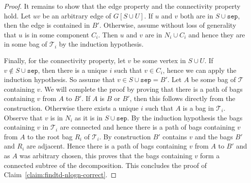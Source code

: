 \documentclass[a4paper,11pt]{article}
\theoremstyle{definition}
\theoremstyle{remark}
\newcommand{\sep}{\mathtt{sep}}
\newcommand{\td}{\mathcal{T}} \newcommand{\tw}{\mathrm{tw}} \newcommand{\w}{\mathrm{w}}
\begin{document}
\begin{proof}
It remains to show that the edge property and the connectivity
  property hold.  Let $uv$ be an arbitrary edge of $G[S \cup U]$.  If
  $u$ and $v$ both are in $S \cup \sep$, then the edge is contained in
  $B'$.  Otherwise, assume without loss of generality that $u$ is in
  some component $C_i$.  Then $u$ and $v$ are in $N_i \cup C_i$ and
  hence they are in some bag of $\td_i$ by the induction hypothesis.
  
Finally, for the connectivity property, let $v$ be some vertex in $S
  \cup U$.  If $v \notin S \cup \sep$, then there is a unique $i$ such
  that $v \in C_i$, hence we can apply the induction hypothesis.  So
  assume that $v \in S \cup \sep = B'$.  Let $A$ be some bag of $\td$
  containing $v$.  We will complete the proof by proving that there is
  a path of bags containing $v$ from $A$ to $B'$.  If $A$ is $B$ or
  $B'$, then this follows directly from the construction.  Otherwise
  there exists a unique $i$ such that $A$ is a bag in $\td_i$.
  Observe that $v$ is in $N_i$ as it is in $S \cup \sep$.  By the
  induction hypothesis the bags containing $v$ in $\td_i$ are
  connected and hence there is a path of bags containing $v$ from $A$
  to the root bag $R_i$ of $\td_i$.  By construction $B'$ contains $v$
  and the bags $B'$ and $R_i$ are adjacent.  Hence there is a path of
  bags containing $v$ from $A$ to $B'$ and as $A$ was arbitrary
  chosen, this proves that the bags containing $v$ form a connected
  subtree of the decomposition.  This concludes the proof of
  Claim~\ref{claim:findtd-nlogn-correct}.
\end{proof}
\end{document}
